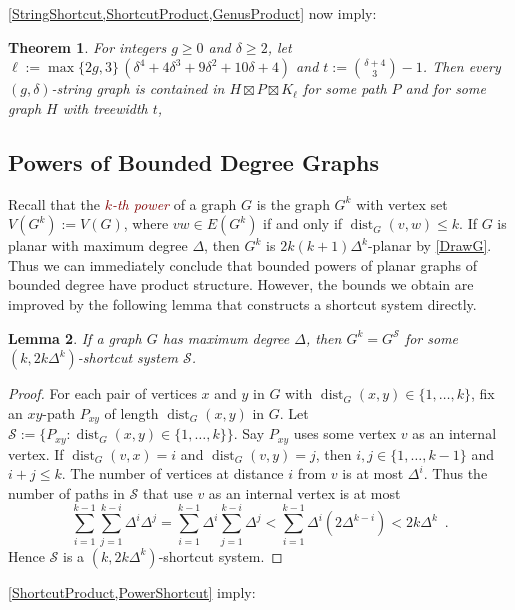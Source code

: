 \documentclass{patmorin}
\theoremstyle{plain}
\newtheorem{thm}{Theorem}
\newtheorem{lem}[thm]{Lemma}
\theoremstyle{definition}
\newcommand{\defin}[1]{\textcolor{Maroon}{\emph{#1}}}
\DeclareMathOperator{\dist}{dist}
\renewcommand{\SS}{\mathcal{S}}
\renewcommand{\geq}{\geqslant}
\renewcommand{\leq}{\leqslant}
\begin{document}
\cref{StringShortcut,ShortcutProduct,GenusProduct} now imply:

\begin{thm}\label{StringProduct}
For integers $g\geq 0$ and $\delta\geq 2$, let $\ell:= \max\{2g,3\} \,(\delta^4 + 4 \delta^3 + 9 \delta^2 + 10 \delta + 4)$ and $t:= \binom{ \delta+4}{3}-1$.
Then  every $(g,\delta)$-string graph is contained in $H\boxtimes P \boxtimes K_{\ell}$ for some path $P$ and for some graph $H$ with treewidth $t$,
\end{thm}


\subsection{Powers of Bounded Degree Graphs}
\label{Powers}
\label{mid_example}

Recall that the \defin{$k$-th power} of a graph $G$ is the graph $G^k$ with vertex set $V(G^k):=V(G)$, where $vw\in E(G^k)$ if and only if $\dist_G(v,w)\leq k$. If $G$ is planar with maximum degree $\Delta$, then $G^k$ is $2k(k+1)\Delta^{k}$-planar by \cref{DrawG}.  Thus we can immediately conclude that bounded powers of planar graphs of bounded degree have product structure. However, the bounds we obtain are improved by the following lemma that constructs a shortcut system directly.

\begin{lem}
\label{PowerShortcut}
If a graph $G$ has maximum degree $\Delta$, then $G^k = G^\SS$ for some $(k,2k \Delta^{k})$-shortcut system $\SS$.
\end{lem}

\begin{proof}
For each pair of vertices $x$ and $y$ in $G$ with $\dist_G(x,y)\in\{1,\dots,k\}$, fix an $xy$-path $P_{xy}$ of length
$\dist_G(x,y)$  in $G$. Let $\SS:=\{P_{xy}: \dist_G(x,y)\in\{1,\dots,k\} \}$. Say $P_{xy}$ uses some vertex $v$ as an internal vertex. If $\dist_G(v,x)=i$ and $\dist_G(v,y)=j$, then $i,j\in\{1,\dots,k-1\}$ and $i+j\leq k$. The number of vertices at distance $i$ from $v$ is at most $\Delta^i$. Thus the number of paths in $\SS$ that use $v$ as an internal vertex is at most
\[\sum_{i=1}^{k-1} \sum_{j=1}^{k-i} \Delta^i\Delta^j
= \sum_{i=1}^{k-1} \Delta^i \sum_{j=1}^{k-i} \Delta^j
< \sum_{i=1}^{k-1} \Delta^i ( 2 \Delta^{k-i} )
< 2k \Delta^k\enspace.\]
Hence $\SS$ is a $(k, 2k \Delta^k)$-shortcut system.
\end{proof}

\cref{ShortcutProduct,PowerShortcut} imply:
\end{document}
